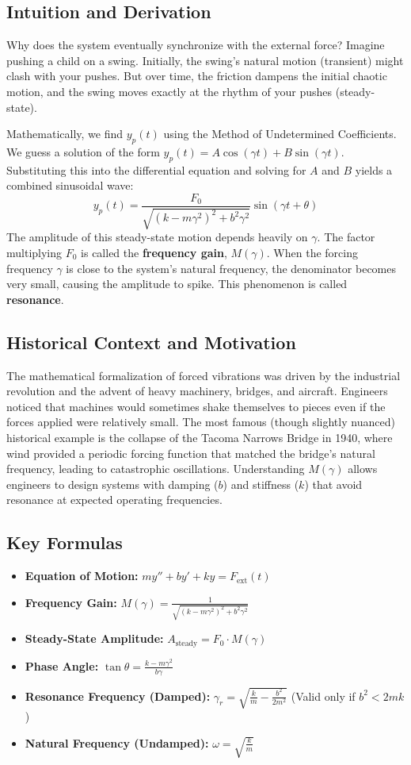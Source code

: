 \documentclass[11pt]{article}
\begin{document}
\subsection{Intuition and Derivation}
Why does the system eventually synchronize with the external force? Imagine pushing a child on a swing. Initially, the swing's natural motion (transient) might clash with your pushes. But over time, the friction dampens the initial chaotic motion, and the swing moves exactly at the rhythm of your pushes (steady-state). 

Mathematically, we find $y_p(t)$ using the Method of Undetermined Coefficients. We guess a solution of the form $y_p(t) = A \cos(\gamma t) + B \sin(\gamma t)$. Substituting this into the differential equation and solving for $A$ and $B$ yields a combined sinusoidal wave:
\[ y_p(t) = \frac{F_0}{\sqrt{(k-m\gamma^2)^2 + b^2\gamma^2}} \sin(\gamma t + \theta) \]
The amplitude of this steady-state motion depends heavily on $\gamma$. The factor multiplying $F_0$ is called the \textbf{frequency gain}, $M(\gamma)$. When the forcing frequency $\gamma$ is close to the system's natural frequency, the denominator becomes very small, causing the amplitude to spike. This phenomenon is called \textbf{resonance}.

\subsection{Historical Context and Motivation}
The mathematical formalization of forced vibrations was driven by the industrial revolution and the advent of heavy machinery, bridges, and aircraft. Engineers noticed that machines would sometimes shake themselves to pieces even if the forces applied were relatively small. The most famous (though slightly nuanced) historical example is the collapse of the Tacoma Narrows Bridge in 1940, where wind provided a periodic forcing function that matched the bridge's natural frequency, leading to catastrophic oscillations. Understanding $M(\gamma)$ allows engineers to design systems with damping ($b$) and stiffness ($k$) that avoid resonance at expected operating frequencies.

\subsection{Key Formulas}
\begin{itemize}
    \item \textbf{Equation of Motion:} $m y'' + b y' + k y = F_{\text{ext}}(t)$
    \item \textbf{Frequency Gain:} $M(\gamma) = \frac{1}{\sqrt{(k-m\gamma^2)^2 + b^2\gamma^2}}$
    \item \textbf{Steady-State Amplitude:} $A_{\text{steady}} = F_0 \cdot M(\gamma)$
    \item \textbf{Phase Angle:} $\tan \theta = \frac{k-m\gamma^2}{b\gamma}$
    \item \textbf{Resonance Frequency (Damped):} $\gamma_r = \sqrt{\frac{k}{m} - \frac{b^2}{2m^2}}$ (Valid only if $b^2 < 2mk$)
    \item \textbf{Natural Frequency (Undamped):} $\omega = \sqrt{\frac{k}{m}}$
\end{itemize}
\end{document}
